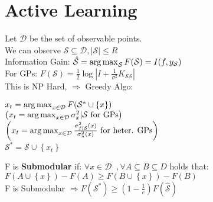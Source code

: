 \section{Active Learning}
Let $\mathcal{D}$ be the set of observable points. \\
We can observe $\mathcal{S}\subseteq \mathcal{D}, \vert \mathcal{S}\vert\leq R$\\
Information Gain: $\hat{\mathcal{S}}=\operatorname*{arg\,max}_{\mathcal{S}} F(\mathcal{S})=I(f,y_\mathcal{S})$\\
For GPs: $F(\mathcal{S})=\frac{1}{2}\log\left\lvert I+\frac{1}{\sigma^2}K_{\mathcal{SS}}\right\rvert $\\
This is NP Hard, $\Rightarrow$ Greedy Algo:\\
\begin{algorithm}[H]
    {
        $x_{t} = \operatorname*{arg\,max}_{x\in\mathcal{D}}F(\mathcal{S^*}\cup\left\{x\right\})$\\
        $\left(x_{t} = \operatorname*{arg\,max}_{x\in\mathcal{D}} \sigma^2_{x}\vert \mathcal{S}\text{ for GPs}\right)$\\
        $\left(x_{t} = \operatorname*{arg\,max}_{x\in\mathcal{D}} \frac{\sigma^2_{f\vert \mathcal{S}}(x)}{\sigma^2_{n}(x)} \text{ for heter. GPs}\right)$\\
        $\mathcal{S^*} = \mathcal{S} \cup \left\{x_{t}\right\}$
    }
\end{algorithm}
F is \textbf{Submodular} if: $\forall x \in \mathcal{D}\;\;, \forall A \subseteq B \subseteq D$ holds that:
$F(A\cup\left\{x\right\})-F(A)\geq F(B\cup\left\{x\right\})-F(B)$\\
F is Submodular $\Rightarrow F(\mathcal{S}^*)\geq \left(1-\frac{1}{e}\right)F(\hat{\mathcal{S}})$

